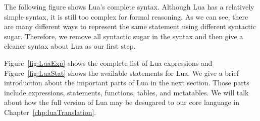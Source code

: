 The following figure shows Lua's complete syntax.
%
Although Lua has a relatively simple syntax, it is still too complex for formal reasoning.
As we can see, there are
many different ways to represent the same statement using different syntactic sugar. Therefore, we remove all syntactic sugar in the syntax and then give a cleaner syntax about Lua as our first step.

Figure~\ref{fig:LuaExp} shows the complete list of Lua expressions
and Figure~\ref{fig:LuaStat} shows the available statements for Lua.
We give a brief introduction about the important parts of Lua in the next section. Those parts include expressions, statements, functions, tables, and metatables. We will talk about how the full version of Lua may be desugared to our core language in Chapter~\ref{chp:luaTranslation}.


\newcommand{\syntax}[2]{{\tt #1}{\tt ~::=}{\tt ~~#2}\\}

\newcommand{\syntaxcase}[1]{{\tt \quad\quad\quad\quad\quad\quad~}{\tt ~~#1}\\}

